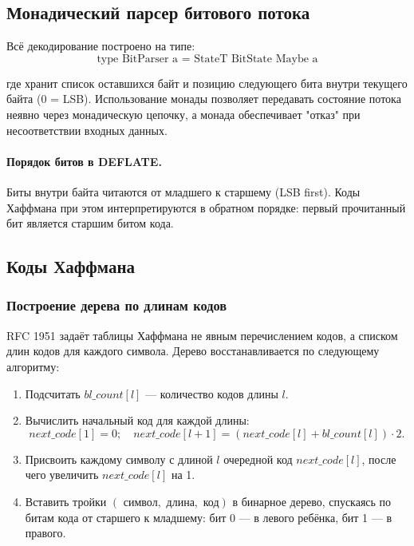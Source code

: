 \documentclass[12pt,a4paper]{article}
\begin{document}
\subsection{Монадический парсер битового потока}

Всё декодирование построено на типе:
\[
\text{type BitParser a = StateT BitState Maybe a}
\]

где  хранит список оставшихся байт и позицию следующего бита
внутри текущего байта (0 = LSB). Использование монады  позволяет
передавать состояние потока неявно через монадическую цепочку, а монада
 обеспечивает "отказ" при несоответствии входных данных.

\paragraph{Порядок битов в DEFLATE.}

Биты внутри байта читаются от младшего к старшему (LSB first).
Коды Хаффмана при этом интерпретируются в обратном порядке:
первый прочитанный бит является старшим битом кода.

\subsection{Коды Хаффмана}
\label{sec:huffman}

\subsubsection{Построение дерева по длинам кодов}

RFC 1951 задаёт таблицы Хаффмана не явным перечислением кодов,
а списком длин кодов для каждого символа. Дерево восстанавливается
по следующему алгоритму:

\begin{enumerate}
  \item Подсчитать $bl\_count[l]$ — количество кодов длины $l$.
  \item Вычислить начальный код для каждой длины:
        \[
          next\_code[1] = 0;\quad
          next\_code[l+1] = \left(next\_code[l] + bl\_count[l]\right) \cdot 2.
        \]
  \item Присвоить каждому символу с длиной $l$ очередной код $next\_code[l]$,
        после чего увеличить $next\_code[l]$ на 1.
  \item Вставить тройки $(\text{ символ}, \text{ длина}, \text{ код})$
        в бинарное дерево, спускаясь по битам кода от старшего к младшему:
        бит 0 — в левого ребёнка, бит 1 — в правого.
\end{enumerate}
\end{document}

